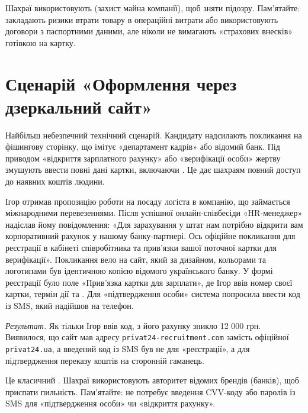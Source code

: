  Шахраї використовують  (захист майна компанії), щоб зняти підозру. Пам’ятайте:  закладають ризики втрати товару в операційні витрати або використовують договори з паспортними даними, але ніколи не вимагають «страхових внесків» готівкою на картку.

\vspace{0.3cm}
\section{Сценарій «Оформлення через дзеркальний сайт»}

Найбільш небезпечний технічний сценарій. Кандидату надсилають покликання на фішингову сторінку, що імітує «департамент кадрів» або відомий банк. Під приводом «відкриття зарплатного рахунку» або «верифікації особи» жертву змушують ввести повні дані картки, включаючи . Це дає шахраям повний доступ до наявних коштів людини.

\newpage


Ігор отримав пропозицію роботи на посаду логіста в компанію, що займається міжнародними перевезеннями. Після успішної онлайн-співбесіди «HR-менеджер» надіслав йому повідомлення: «Для зарахування у штат нам потрібно відкрити вам корпоративний рахунок у нашому банку-партнері. Ось офіційне покликання для реєстрації в кабінеті співробітника та прив'язки вашої поточної картки для верифікації». Покликання вело на сайт, який за дизайном, кольорами та логотипами був ідентичною копією відомого українського банку. У формі реєстрації було поле «Прив'язка картки для зарплати», де Ігор ввів номер своєї картки, термін дії та . Для «підтвердження особи» система попросила ввести код із SMS, який надійшов на телефон. 

\textit{Результат.} Як тільки Ігор ввів код, з його рахунку зникло 12 000 грн. Виявилося, що сайт мав адресу \texttt{privat24-recruitment.com} замість офіційної \texttt{privat24.ua}, а введений код із SMS був не для «реєстрації», а для підтвердження переказу коштів на сторонній гаманець.

 Це класичний . Шахраї використовують авторитет відомих брендів (банків), щоб приспати пильність. Пам'ятайте:  не потребує введення CVV-коду або паролів із SMS для «підтвердження особи» чи «відкриття рахунку».

